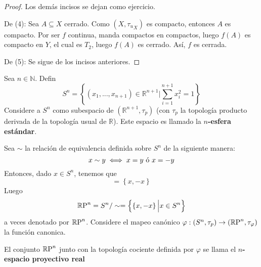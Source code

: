 \documentclass[12pt]{report}
\theoremstyle{largebreak}
\newcommand\cf[3]{\ensuremath{#1:#2\rightarrow#3}}
\begin{document}
    \begin{proof}
        Los demás incisos se dejan como ejercicio.

        De (4): Sea $A\subseteq X$ cerrado. Como $(X,{\tau_u}_X)$ es compacto, entonces $A$ es compacto. Por ser $f$ continua, manda compactos en compactos, luego $f(A)$ es compacto en $Y$, el cual es $T_2$, luego $f(A)$ es cerrado. Así, $f$ es cerrada.

        De (5): Se sigue de los incisos anteriores.
    \end{proof}

    \newcommand{\RP}{\ensuremath{\mathbb{R}\textup{P}}}

    \begin{exa}
        Sea $n\in\mathbb{N}$. Defin 
        \begin{equation*}
            S^{n}=\left\{(x_1,...,x_{ n+1})\in\mathbb{R}^{ n+1}\Big|\sum_{ i=1}^{ n+1}x_i^2=1 \right\}
        \end{equation*}
        Considere a $S^n$ como subespacio de $(\mathbb{R}^{ n+1},\tau_p)$ (con $\tau_p$ la topología producto derivada de la topología usual de $\mathbb{R}$). Este espacio es llamado la \textbf{$n$-esfera estándar}.

        Sea $\sim$ la relación de equivalencia definida sobre $S^n$ de la siguiente manera:
        \begin{equation*}
            x\sim y\iff x=y\textup{ ó }x=-y
        \end{equation*}
        Entonces, dado $x\in S^n$, tenemos que
        \begin{equation*}
            [x]=\left\{x,-x\right\}
        \end{equation*}
        Luego
        \begin{equation*}
            \RP^n=S^n/\sim=\left\{\left\{x,-x\right\}\Big|x\in S^n \right\}
        \end{equation*}
        a veces denotado por $\RP^n$. Considere el mapeo canónico $\cf{\varphi}{(S^n,\tau_p)}{(\RP^n,\tau_\varphi)}$ la función canonica.

        El conjunto $\RP^n$ junto con la topología cociente definida por $\varphi$ se llama el \textbf{$n$-espacio proyectivo real}
    \end{exa}
    
\end{document}
